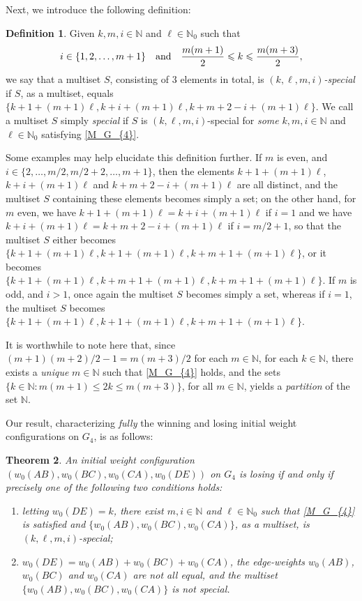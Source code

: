 \documentclass[11pt,reqno]{amsart}
\newtheorem{theorem}{Theorem}[section]
\theoremstyle{definition}
\newtheorem{defn}[theorem]{Definition}
\theoremstyle{definition}
\begin{document}
Next, we introduce the following definition:
\begin{defn}\label{defn:special}
Given $k, m, i \in \mathbb{N}$ and $\ell \in \mathbb{N}_{0}$ such that
\begin{equation}\label{M_G_{4}}
i \in \{1,2,\ldots,m+1\} \quad \text{and} \quad \frac{m(m+1)}{2} \leqslant k \leqslant \frac{m(m+3)}{2},
\end{equation}
we say that a multiset $S$, consisting of $3$ elements in total, is \emph{$(k,\ell,m,i)$-special} if $S$, as a multiset, equals $\{k+1+(m+1)\ell,k+i+(m+1)\ell,k+m+2-i+(m+1)\ell\}$. We call a multiset $S$ simply \emph{special} if $S$ is $(k,\ell,m,i)$-special for \emph{some} $k, m, i \in \mathbb{N}$ and $\ell \in \mathbb{N}_{0}$ satisfying \eqref{M_G_{4}}.
\end{defn}
Some examples may help elucidate this definition further. If $m$ is even, and $i\in\{2,\ldots,m/2,m/2+2,\ldots,m+1\}$, then the elements $k+1+(m+1)\ell$, $k+i+(m+1)\ell$ and $k+m+2-i+(m+1)\ell$ are all distinct, and the multiset $S$ containing these elements becomes simply a set; on the other hand, for $m$ even, we have $k+1+(m+1)\ell=k+i+(m+1)\ell$ if $i=1$ and we have $k+i+(m+1)\ell=k+m+2-i+(m+1)\ell$ if $i=m/2+1$, so that the multiset $S$ either becomes $\{k+1+(m+1)\ell,k+1+(m+1)\ell,k+m+1+(m+1)\ell\}$, or it becomes $\{k+1+(m+1)\ell,k+m+1+(m+1)\ell,k+m+1+(m+1)\ell\}$. If $m$ is odd, and $i>1$, once again the multiset $S$ becomes simply a set, whereas if $i=1$, the multiset $S$ becomes $\{k+1+(m+1)\ell,k+1+(m+1)\ell,k+m+1+(m+1)\ell\}$.

It is worthwhile to note here that, since $(m+1)(m+2)/2-1=m(m+3)/2$ for each $m \in \mathbb{N}$, for each $k \in \mathbb{N}$, there exists a \emph{unique} $m \in \mathbb{N}$ such that \eqref{M_G_{4}} holds, and the sets $\{k \in \mathbb{N}: m(m+1) \leqslant 2k \leqslant m(m+3)\}$, for all $m \in \mathbb{N}$, yields a \emph{partition} of the set $\mathbb{N}$. 

Our result, characterizing \emph{fully} the winning and losing initial weight configurations on $G_{4}$, is as follows:
\begin{theorem}\label{thm:main_G_{4}}
An initial weight configuration $(w_{0}(AB),w_{0}(BC),w_{0}(CA),w_{0}(DE))$ on $G_{4}$ is losing if and only if precisely one of the following two conditions holds:
\begin{enumerate}[label=(A\arabic*), ref=A\arabic*]
\item \label{G_{4}_losing_cond_1} \sloppy letting $w_{0}(DE) = k$, there exist $m, i \in \mathbb{N}$ and $\ell \in \mathbb{N}_{0}$ such that \eqref{M_G_{4}} is satisfied and $\{w_{0}(AB),w_{0}(BC),w_{0}(CA)\}$, as a multiset, is $(k,\ell,m,i)$-special;
\item \label{G_{4}_losing_cond_2} $w_{0}(DE)=w_{0}(AB)+w_{0}(BC)+w_{0}(CA)$, the edge-weights $w_{0}(AB)$, $w_{0}(BC)$ and $w_{0}(CA)$ are not all equal, and the multiset $\{w_{0}(AB),w_{0}(BC),w_{0}(CA)\}$ is \emph{not} special.
\end{enumerate}
\end{theorem} 
\end{document}
